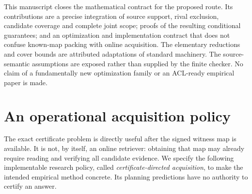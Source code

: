 \documentclass[11pt]{article}
\theoremstyle{definition}
\theoremstyle{remark}
\begin{document}
This manuscript closes the mathematical contract for the proposed route. Its
contributions are a precise integration of source support, rival exclusion,
candidate coverage and complete joint scope; proofs of the resulting
conditional guarantees; and an optimization and implementation contract that
does not confuse known-map packing with online acquisition. The elementary
reductions and cover bounds are attributed adaptations of standard machinery.
The source-semantic assumptions are exposed rather than supplied by the
finite checker. No claim of a fundamentally new optimization family or an
ACL-ready empirical paper is made.




\section{An operational acquisition policy}
\label{sec:online}
The exact certificate problem is directly useful after the signed witness map
is available. It is not, by itself, an online retriever: obtaining that map may
already require reading and verifying all candidate evidence. We specify the
following implementable research policy, called \emph{certificate-directed
acquisition}, to make the intended empirical method concrete. Its planning
predictions have no authority to certify an answer.
\end{document}
